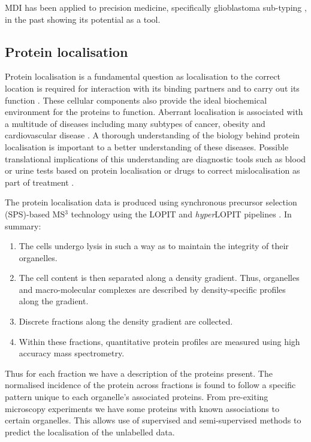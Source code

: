 \documentclass[11pt]{article} %
\begin{document}
MDI has been applied to precision medicine, specifically glioblastoma sub-typing \cite{SavageIdentifyingcancersubtypes2013a}, in the past showing its potential as a tool.

\subsection{Protein localisation}
Protein localisation is a fundamental question as localisation to the correct location is required for interaction with its binding partners and to carry out its function \cite{GibsonCellregulationdetermined2009}. These cellular components also provide the ideal biochemical environment for the proteins to function. Aberrant localisation is associated with a multitude of diseases including many subtypes of cancer, obesity and cardiovascular disease \cite{SiljeeSubcellularlocalizationMC4R2018a}\cite{HungProteinlocalizationdisease2011a}\cite{KauNucleartransportcancer2004a}. A thorough understanding of the biology behind protein localisation is important to a better understanding of these diseases. Possible translational implications of this understanding are diagnostic tools such as blood or urine tests based on protein localisation or drugs to correct mislocalisation as part of treatment \cite{KauNucleartransportcancer2004a}\cite{HorganOmictechnologiesgenomics2011a}.

The protein localisation data is produced using synchronous precursor selection (SPS)-based MS$^3$ technology using the LOPIT and \emph{hyper}LOPIT pipelines \cite{GeladakiLOPITDCsimplerapproach2018}\cite{DunkleyLocalizationOrganelleProteins2004}. In summary:
\begin{enumerate}
 \item The cells undergo lysis in such a way as to maintain the integrity of their organelles.
 \item The cell content is then separated along a density gradient. Thus, organelles and macro-molecular complexes are described by density-specific profiles along the gradient.
 \item Discrete fractions along the density gradient are collected.
 \item Within these fractions, quantitative protein profiles are measured using high accuracy mass spectrometry.
\end{enumerate}
Thus for each fraction we have a description of the proteins present. The normalised incidence of the protein across fractions is found to follow a specific pattern unique to each organelle's associated proteins. From pre-exiting microscopy experiments we have some proteins with known associations to certain organelles. This allows use of supervised and semi-supervised methods to predict the localisation of the unlabelled data.
\end{document}
